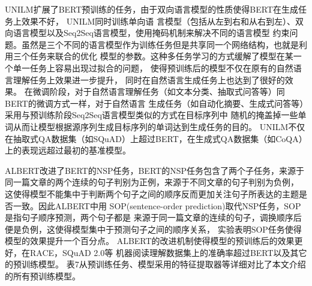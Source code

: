 UNILM扩展了BERT预训练的任务，由于双向语言模型的性质使得BERT在生成任务上效果不好，
UNILM同时训练单向语
言模型（包括从左到右和从右到左）、双向语言模型以及Seq2Seq语言模型，使用掩码机制来解决不同的语言模型
约束问题。虽然是三个不同的语言模型作为训练任务但是共享同一个网络结构，也就是利用三个任务来联合的优化
模型的参数。这种多任务学习的方式缓解了模型在某一个单一任务上容易出现过拟合的问题，
使得预训练后的模型不仅在原有的自然语言理解任务上效果进一步提升，
同时在自然语言生成任务上也达到了很好的效果。
在微调阶段，对于自然语言理解任务（如文本分类、抽取式问答等）同BERT的微调方式一样，对于自然语言
生成任务（如自动化摘要、生成式问答等）采用与预训练阶段Seq2Seq语言模型类似的方式在目标序列中
随机的掩盖掉一些单词从而让模型根据源序列生成目标序列的单词达到生成任务的目的。
UNILM不仅在抽取式QA数据集（如SQuAD）上超过BERT，在生成式QA数据集（如CoQA）上的表现远超过最初的基准模型。




ALBERT改进了BERT的NSP任务，BERT的NSP任务包含了两个子任务，来源于同一篇文章的两个连续的句子判别为正例，来源于不同文章的句子判别为负例，
这使得模型不能集中于判断两个句子之间的顺序反而更加关注句子所表达的主题是否一致。因此ALBERT中用
SOP(sentence-order prediction)取代NSP任务，SOP是指句子顺序预测，两个句子都是
来源于同一篇文章的连续的句子，调换顺序后便是负例，这使得模型集中于预测句子之间的顺序关系，
实验表明SOP任务使得模型的效果提升一个百分点。
ALBERT的改进机制使得模型的预训练后的效果更好，在RACE，SQuAD 2.0等
机器阅读理解数据集上的准确率超过BERT以及其它的预训练模型。
表7从预训练任务、模型采用的特征提取器等详细对比了本文介绍的所有预训练模型。

